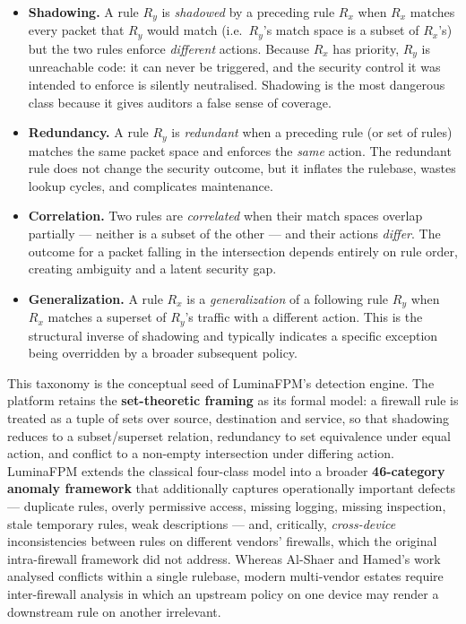 \begin{itemize}[leftmargin=2em]
  \item \textbf{Shadowing.} A rule $R_y$ is \emph{shadowed} by a preceding rule $R_x$ when $R_x$ matches every packet that $R_y$ would match (i.e.\ $R_y$'s match space is a subset of $R_x$'s) but the two rules enforce \emph{different} actions. Because $R_x$ has priority, $R_y$ is unreachable code: it can never be triggered, and the security control it was intended to enforce is silently neutralised. Shadowing is the most dangerous class because it gives auditors a false sense of coverage.
  \item \textbf{Redundancy.} A rule $R_y$ is \emph{redundant} when a preceding rule (or set of rules) matches the same packet space and enforces the \emph{same} action. The redundant rule does not change the security outcome, but it inflates the rulebase, wastes lookup cycles, and complicates maintenance.
  \item \textbf{Correlation.} Two rules are \emph{correlated} when their match spaces overlap partially --- neither is a subset of the other --- and their actions \emph{differ}. The outcome for a packet falling in the intersection depends entirely on rule order, creating ambiguity and a latent security gap.
  \item \textbf{Generalization.} A rule $R_x$ is a \emph{generalization} of a following rule $R_y$ when $R_x$ matches a superset of $R_y$'s traffic with a different action. This is the structural inverse of shadowing and typically indicates a specific exception being overridden by a broader subsequent policy.
\end{itemize}

This taxonomy is the conceptual seed of LuminaFPM's detection engine. The platform retains the \textbf{set-theoretic framing} as its formal model: a firewall rule is treated as a tuple of sets over source, destination and service, so that shadowing reduces to a subset/superset relation, redundancy to set equivalence under equal action, and conflict to a non-empty intersection under differing action. LuminaFPM extends the classical four-class model into a broader \textbf{46-category anomaly framework} that additionally captures operationally important defects --- duplicate rules, overly permissive access, missing logging, missing inspection, stale temporary rules, weak descriptions --- and, critically, \emph{cross-device} inconsistencies between rules on different vendors' firewalls, which the original intra-firewall framework did not address. Whereas Al-Shaer and Hamed's work analysed conflicts within a single rulebase, modern multi-vendor estates require inter-firewall analysis in which an upstream policy on one device may render a downstream rule on another irrelevant.

